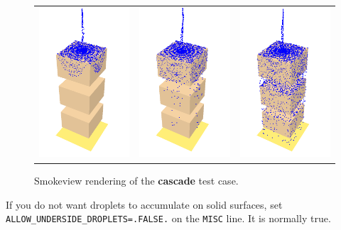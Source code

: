 \documentclass[11pt]{book}
\newcommand{\ct}{\tt\small}
\begin{document}
\begin{figure}[ht]
\begin{center}
\begin{tabular}{lcr}
\includegraphics[height=2.2in]{SCRIPT_FIGURES/cascade_1} &
\includegraphics[height=2.2in]{SCRIPT_FIGURES/cascade_2} &
\includegraphics[height=2.2in]{SCRIPT_FIGURES/cascade_3}
\end{tabular}
\end{center}
\caption[Example of water cascading over solid obstructions.]{Smokeview rendering of the {\bf cascade} test case.}
\label{cascade}
\end{figure}

\begin{warning}
\noindent If you do not want droplets to accumulate on solid surfaces, set {\ct ALLOW\_UNDERSIDE\_DROPLETS=.FALSE.} on the
{\ct MISC} line. It is normally true.
\end{warning}
\end{document}
